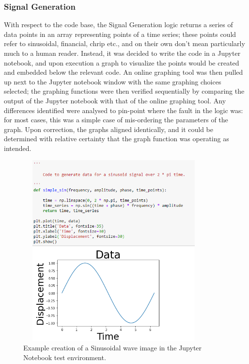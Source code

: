 \subsubsection{Signal Generation}
With respect to the code base, the Signal Generation logic returns a series of data points in an array representing points of a time series; these points could refer to sinusoidal, financial, chrip etc., and on their own don't mean particularly much to a human reader. Instead, it was decided to write the code in a Jupyter notebook, and upon execution a graph to visualize the points would be created and embedded below the relevant code. An online graphing tool was then pulled up next to the Jupyter notebook window with the same graphing choices selected; the graphing functions were then verified sequentially by comparing the output of the Jupyter notebook with that of the online graphing tool. Any differences identified were analysed to pin-point where the fault in the logic was: for most cases, this was a simple case of mis-ordering the parameters of the graph. Upon correction, the graphs aligned identically, and it could be determined with relative certainty that the graph function was operating as intended.

\begin{figure}
    \centering
    \includegraphics[width=280pt, height=280pt]{figures/jupyter.png}
    \caption{Example creation of a Sinusoidal wave image in the Jupyter Notebook test environment.}
    \label{fig:jupyter_test}
\end{figure}


